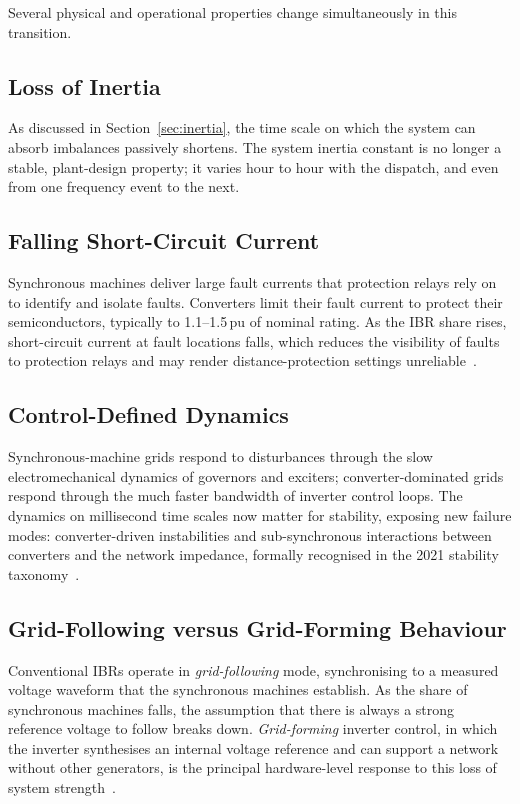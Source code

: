 \documentclass[conference]{IEEEtran}
\begin{document}
Several physical and operational properties change simultaneously in this transition.

\subsection{Loss of Inertia}
As discussed in Section~\ref{sec:inertia}, the time scale on which the system can absorb imbalances passively shortens. The system inertia constant is no longer a stable, plant-design property; it varies hour to hour with the dispatch, and even from one frequency event to the next.

\subsection{Falling Short-Circuit Current}
Synchronous machines deliver large fault currents that protection relays rely on to identify and isolate faults. Converters limit their fault current to protect their semiconductors, typically to 1.1--1.5\,pu of nominal rating. As the IBR share rises, short-circuit current at fault locations falls, which reduces the visibility of faults to protection relays and may render distance-protection settings unreliable~\cite{entsoe2017hpopeips}.

\subsection{Control-Defined Dynamics}
Synchronous-machine grids respond to disturbances through the slow electromechanical dynamics of governors and exciters; converter-dominated grids respond through the much faster bandwidth of inverter control loops. The dynamics on millisecond time scales now matter for stability, exposing new failure modes: converter-driven instabilities and sub-synchronous interactions between converters and the network impedance, formally recognised in the 2021 stability taxonomy~\cite{hatziargyriou2021revisited}.

\subsection{Grid-Following versus Grid-Forming Behaviour}
Conventional IBRs operate in \emph{grid-following} mode, synchronising to a measured voltage waveform that the synchronous machines establish. As the share of synchronous machines falls, the assumption that there is always a strong reference voltage to follow breaks down. \emph{Grid-forming} inverter control, in which the inverter synthesises an internal voltage reference and can support a network without other generators, is the principal hardware-level response to this loss of system strength~\cite{lasseter2020gridforming}.
\end{document}
